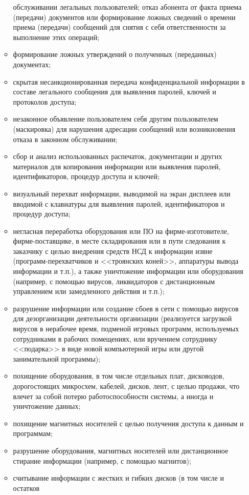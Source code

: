 \begin{enumerate}
\begin{itemize}
	обслуживании легальных пользователей; отказ абонента от факта приема (передачи)
	документов или формирование ложных сведений о времени приема (передачи)
	сообщений для снятия с себя ответственности за выполнение этих операций;
	\item формирование ложных утверждений о полученных (переданных) документах;
	\item скрытая несанкционированная передача конфиденциальной информации в
	составе легального сообщения для выявления паролей, ключей и протоколов доступа; 
	\item незаконное объявление пользователем себя другим пользователем
	(маскировка) для нарушения адресации сообщений или возникновения отказа в
	законном обслуживании;
	\item сбор и анализ использованных распечаток, документации и других материалов
	для копирования информации или выявления паролей, идентификаторов, процедур
	доступа и ключей;
	\item визуальный перехват информации, выводимой на экран дисплеев или вводимой
	с клавиатуры для выявления паролей, идентификаторов и процедур доступа;
	\item негласная переработка оборудования или ПО на фирме-изготовителе,
	фирме-поставщике, в месте складирования или в пути следования к заказчику с
	целью внедрения средств НСД к информации извне (программ-перехватчиков и
	<<троянских коней>>, аппаратуры вывода информации и т.п.), а также уничтожение
	информации или оборудования (например, с помощью вирусов, ликвидаторов с
	дистанционным управлением или замедленного действия и т.п.);
	\item разрушение информации или создание сбоев в сети с помощью вирусов для
дезорганизации деятельности организации (реализуется загрузкой вирусов в
нерабочее время, подменой игровых программ, используемых сотрудниками в рабочих
помещениях, или вручением сотруднику <<подарка>> в виде новой компьютерной игры
или другой занимательной программы);
	\item похищение оборудования, в том числе отдельных плат, дисководов,
	дорогостоящих микросхем, кабелей, дисков, лент, с целью продажи, что влечет за
	собой потерю работоспособности системы, а иногда и уничтожение данных;
	\item похищение магнитных носителей с целью получения доступа к данным и
	программам; 
	\item разрушение оборудования, магнитных носителей или дистанционное стирание
	информации (например, с помощью магнитов); 
	\item считывание информации с жестких и гибких дисков (в том числе и остатков

\end{itemize}
\end{enumerate}
